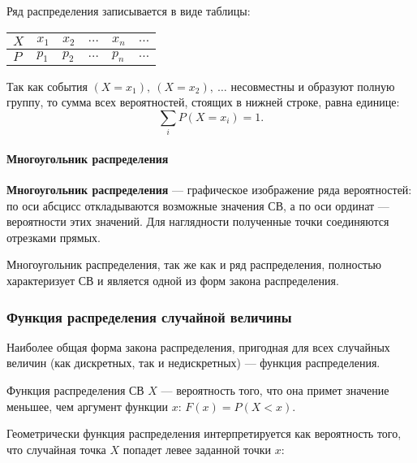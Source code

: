 \documentclass[a4paper]{article}
\newcommand{\key}[1]{{\bfseries\color{Medium} #1}}
\begin{document}
                Ряд распределения записывается в виде таблицы:

                \begin{tabular}{*{6}{|C{1.8cm}}|}
                    \hline
                    $X$ & $x_1$ & $x_2$ & $\ldots$ & $x_n$ & $\ldots$ \\
                    \hline
                    $P$ & $p_1$ & $p_2$ & $\ldots$ & $p_n$ & $\ldots$ \\
                    \hline
                \end{tabular}

                Так как события $(X = x_1) , \: (X = x_2) , \: \ldots$ несовместны и образуют полную группу, то сумма всех вероятностей, стоящих в нижней строке, равна единице:
                \begin{equation*}
                    \sum\limits_{i} P(X = x_i) = 1 .
                \end{equation*}

                \paragraph{Многоугольник распределения}

                    \key{Многоугольник распределения} --- графическое изображение ряда вероятностей: по оси абсцисс откладываются возможные значения СВ, а по оси ординат --- вероятности этих значений. Для наглядности полученные точки соединяются отрезками прямых.
                    
                    Многоугольник распределения, так же как и ряд распределения, полностью характеризует СВ и является одной из форм закона распределения.

            \subsubsection{Функция распределения случайной величины}

                Наиболее общая форма закона распределения, пригодная для всех случайных величин (как дискретных, так и недискретных) --- функция распределения.
                
                Функция распределения СВ $X$ --- вероятность того, что она примет значение меньшее, чем аргумент функции $x$: $F(x) = P(X < x)$.
                
                Геометрически функция распределения интерпретируется как вероятность того, что случайная точка $X$ попадет левее заданной точки $x$:
\end{document}
